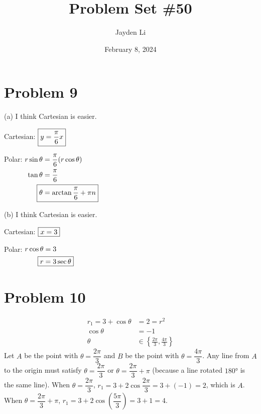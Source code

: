 \documentclass{article}
\title{Problem Set \#50}
\author{Jayden Li}
\date{February 8, 2024}
\begin{document}
\setlength{\abovedisplayskip}{0pt}
\fontsize{12pt}{12pt}\selectfont
\maketitle

\section*{Problem 9}
\begin{itemize}
	\begin{minipage}[t]{0.5\linewidth}
		\item[(a)]
		I think Cartesian is easier.
		
		Cartesian:
		$\begin{aligned}[t]
			\Aboxed{y&=\frac{\pi}{6}x}
		\end{aligned} \\$

		Polar:
		$\begin{aligned}[t]
			r\sin\theta&=\frac{\pi}{6}(r\cos\theta) \\
			\tan\theta&=\frac{\pi}{6} \\
			\Aboxed{\theta&=\arctan\frac{\pi}{6}+\pi n}
		\end{aligned}$
	\end{minipage}
	\begin{minipage}[t]{0.5\linewidth}
		\item[(b)]
		I think Cartesian is easier.

		Cartesian:
		$\begin{aligned}[t]
			\Aboxed{x&=3}
		\end{aligned} \\$

		Polar:
		$\begin{aligned}[t]
			r\cos\theta&=3 \\
			\Aboxed{r&=3\sec\theta}
		\end{aligned}$
	\end{minipage}

\end{itemize}

\section*{Problem 10}
\begin{align*}
	r_1=3+\cos\theta&=2=r^2 \\
	\cos\theta&=-1 \\
	\theta&\in\left\{\frac{2\pi}{3},\frac{4\pi}{3}\right\}
\end{align*}
Let $A$ be the point with $\theta=\dfrac{2\pi}{3}$ and $B$ be the point with $\theta=\dfrac{4\pi}{3}$. Any line from $A$ to the origin must satisfy $\theta=\dfrac{2\pi}{3}$ or $\theta=\dfrac{2\pi}{3}+\pi$ (because a line rotated $\ang{180}$ is the same line). When $\theta=\dfrac{2\pi}{3}$, $r_1=3+2\cos\dfrac{2\pi}{3}=3+(-1)=2$, which is $A$. When $\theta=\dfrac{2\pi}{3}+\pi$, $r_1=3+2\cos\left(\dfrac{5\pi}{3}\right)=3+1=4$.
\end{document}
